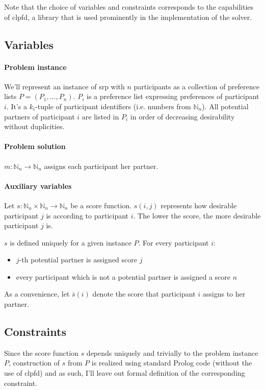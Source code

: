 \documentclass{article}
\newcommand{\nn}{\mathbb{N}_n}
\newcommand{\clpfd}{\acrshort{clpfd}}
\newcommand{\prolog}{Prolog}
\newcommand{\srp}{\acrshort{srp}}
\begin{document}
Note that the choice of variables and constraints corresponds to the capabilities
of \clpfd{}, a library that is used prominently in the implementation
of the solver.

\subsection{Variables}
\paragraph{Problem instance}
We'll represent an instance of \srp{} with $n$ participants as
a collection of preference lists $P = (P_1, \ldots, P_n)$.
$P_i$ is a preference list expressing preferences of participant $i$.
It's a $k_i$-tuple of participant identifiers (i.e. numbers from $\nn$).
All potential partners of participant $i$ are listed in $P_i$ in order of decreasing
desirability without duplicities.

\paragraph{Problem solution}
$m: \nn \rightarrow \nn$ assigns each participant her partner.

\paragraph{Auxiliary variables}
Let $s: \nn \times \nn \rightarrow \nn$ be a score function.
$s(i,j)$ represents how desirable participant $j$ is according to participant $i$.
The lower the score, the more desirable participant $j$ is.

$s$ is defined uniquely for a given instance $P$.
For every participant $i$:

\begin{itemize}
\item $j$-th potential partner is assigned score $j$
\item every participant which is not a potential partner is assigned a score $n$
\end{itemize}

As a convenience, let $\bar{s}(i)$ denote the score that participant $i$ assigns to her partner.

\subsection{Constraints}
Since the score function $s$ depends uniquely and trivially
to the problem instance $P$,
construction of $s$ from $P$ is realized
using standard \prolog{} code (without the use of \clpfd{}) and as such,
I'll leave out formal definition of the corresponding constraint.
\end{document}
